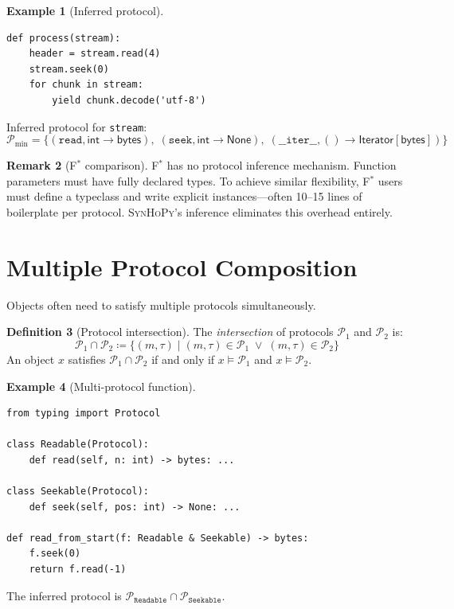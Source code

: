 \documentclass[11pt,a4paper]{report}
\theoremstyle{definition}
\newtheorem{definition}{Definition}[chapter]
\newtheorem{example}[definition]{Example}
\newtheorem{remark}[definition]{Remark}
\theoremstyle{plain}
\newcommand{\PyNone}{\mathsf{None}}
\newcommand{\defeq}{\coloneqq}
\newcommand{\fstar}{F$^{*}$}
\newcommand{\synhopy}{\textsc{SynHoPy}}
\begin{document}
\begin{example}[Inferred protocol]
\begin{lstlisting}[style=python]
def process(stream):
    header = stream.read(4)
    stream.seek(0)
    for chunk in stream:
        yield chunk.decode('utf-8')
\end{lstlisting}
Inferred protocol for \texttt{stream}:
\[
  \mathcal{P}_{\min} = \{
    (\mathtt{read}, \mathsf{int} \to \mathsf{bytes}),\;
    (\mathtt{seek}, \mathsf{int} \to \PyNone),\;
    (\mathtt{\_\_iter\_\_}, () \to \mathsf{Iterator}[\mathsf{bytes}])
  \}
\]
\end{example}

\begin{remark}[\fstar{} comparison]
\fstar{} has no protocol inference mechanism. Function parameters must have
fully declared types. To achieve similar flexibility, \fstar{} users must define
a typeclass and write explicit instances---often 10--15 lines of boilerplate per
protocol. \synhopy{}'s inference eliminates this overhead entirely.
\end{remark}


\section{Multiple Protocol Composition}
\label{sec:multi-protocol}

Objects often need to satisfy multiple protocols simultaneously.

\begin{definition}[Protocol intersection]
The \emph{intersection} of protocols $\mathcal{P}_1$ and $\mathcal{P}_2$ is:
\[
  \mathcal{P}_1 \cap \mathcal{P}_2 \defeq
  \{(m, \tau) \mid (m, \tau) \in \mathcal{P}_1 \;\vee\; (m, \tau) \in \mathcal{P}_2\}
\]
An object $x$ satisfies $\mathcal{P}_1 \cap \mathcal{P}_2$ if and only if
$x \models \mathcal{P}_1$ and $x \models \mathcal{P}_2$.
\end{definition}

\begin{example}[Multi-protocol function]
\begin{lstlisting}[style=python]
from typing import Protocol

class Readable(Protocol):
    def read(self, n: int) -> bytes: ...

class Seekable(Protocol):
    def seek(self, pos: int) -> None: ...

def read_from_start(f: Readable & Seekable) -> bytes:
    f.seek(0)
    return f.read(-1)
\end{lstlisting}
The inferred protocol is
$\mathcal{P}_{\mathtt{Readable}} \cap \mathcal{P}_{\mathtt{Seekable}}$.
\end{example}
\end{document}
